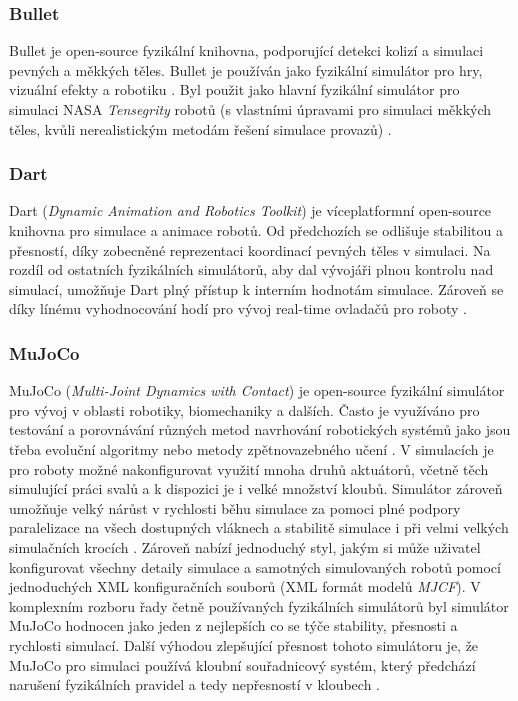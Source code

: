 \subsubsection{Bullet} \label{Bullet}
Bullet je open-source fyzikální knihovna, podporující detekci kolizí a simulaci
pevných a měkkých těles. Bullet je používán jako fyzikální simulátor pro hry,
vizuální efekty a robotiku \citep{coumans}. Byl použit jako hlavní fyzikální
simulátor pro simulaci NASA \emph{Tensegrity} robotů (s vlastními úpravami pro
simulaci měkkých těles, kvůli nerealistickým metodám řešení simulace provazů)
\citep{izadi2018simulating}.

\subsubsection{Dart} \label{Dart}
Dart (\emph{Dynamic Animation and Robotics Toolkit}) je víceplatformní
open-source knihovna pro simulace a animace robotů. Od předchozích se odlišuje
stabilitou a přesností, díky zobecněné reprezentaci koordinací pevných těles v
simulaci. Na rozdíl od ostatních fyzikálních simulátorů, aby dal vývojáři plnou
kontrolu nad simulací, umožňuje Dart plný přístup k interním hodnotám simulace.
Zároveň se díky línému vyhodnocování hodí pro vývoj real-time ovladačů pro
roboty \citep{lee2018dart}.

\subsubsection{MuJoCo} \label{MuJoCo}
MuJoCo (\emph{Multi-Joint Dynamics with Contact}) \citep{deepmind_2021} je
open-source fyzikální simulátor pro vývoj v oblasti robotiky, biomechaniky a
dalších. Často je využíváno pro testování a porovnávání různých metod
navrhování robotických systémů jako jsou třeba evoluční algoritmy nebo metody
zpětnovazebného učení \citep{salimans2017evolution}. V simulacích je pro roboty
možné nakonfigurovat využití mnoha druhů aktuátorů, včetně těch simulující
práci svalů a k dispozici je i velké množství kloubů. Simulátor zároveň
umožňuje velký nárůst v rychlosti běhu simulace za pomoci plné podpory
paralelizace na všech dostupných vláknech a stabilitě simulace i při velmi
velkých simulačních krocích \citep{todorov2012mujoco}. Zároveň nabízí
jednoduchý styl, jakým si může uživatel konfigurovat všechny detaily simulace a
samotných simulovaných robotů pomocí jednoduchých XML konfiguračních souborů
(XML formát modelů \emph{MJCF}). V komplexním rozboru řady četně používaných
fyzikálních simulátorů byl simulátor MuJoCo hodnocen jako jeden z nejlepších co
se týče stability, přesnosti a rychlosti simulací. Další výhodou zlepšující
přesnost tohoto simulátoru je, že MuJoCo pro simulaci používá kloubní
souřadnicový systém, který předchází narušení fyzikálních pravidel a tedy
nepřesností v kloubech \citep{erez2015simulation}.


